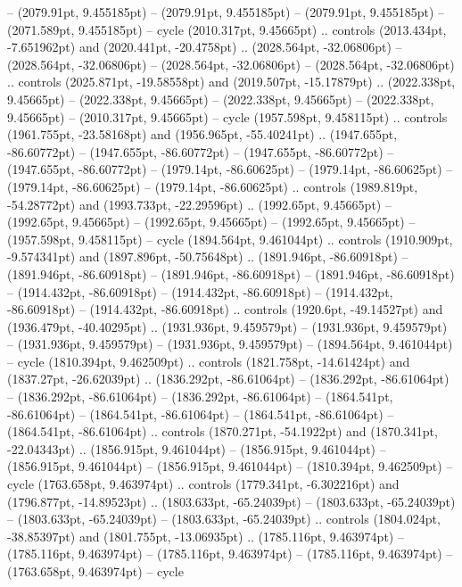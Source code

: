  -- (2079.91pt, 9.455185pt)
 -- (2079.91pt, 9.455185pt)
 -- (2079.91pt, 9.455185pt)
 -- (2071.589pt, 9.455185pt) -- cycle
(2010.317pt, 9.45665pt) .. controls (2013.434pt, -7.651962pt) and (2020.441pt, -20.4758pt) .. (2028.564pt, -32.06806pt)
 -- (2028.564pt, -32.06806pt)
 -- (2028.564pt, -32.06806pt)
 -- (2028.564pt, -32.06806pt) .. controls (2025.871pt, -19.58558pt) and (2019.507pt, -15.17879pt) .. (2022.338pt, 9.45665pt)
 -- (2022.338pt, 9.45665pt)
 -- (2022.338pt, 9.45665pt)
 -- (2022.338pt, 9.45665pt)
 -- (2010.317pt, 9.45665pt) -- cycle
(1957.598pt, 9.458115pt) .. controls (1961.755pt, -23.58168pt) and (1956.965pt, -55.40241pt) .. (1947.655pt, -86.60772pt)
 -- (1947.655pt, -86.60772pt)
 -- (1947.655pt, -86.60772pt)
 -- (1947.655pt, -86.60772pt)
 -- (1979.14pt, -86.60625pt)
 -- (1979.14pt, -86.60625pt)
 -- (1979.14pt, -86.60625pt)
 -- (1979.14pt, -86.60625pt) .. controls (1989.819pt, -54.28772pt) and (1993.733pt, -22.29596pt) .. (1992.65pt, 9.45665pt)
 -- (1992.65pt, 9.45665pt)
 -- (1992.65pt, 9.45665pt)
 -- (1992.65pt, 9.45665pt)
 -- (1957.598pt, 9.458115pt) -- cycle
(1894.564pt, 9.461044pt) .. controls (1910.909pt, -9.574341pt) and (1897.896pt, -50.75648pt) .. (1891.946pt, -86.60918pt)
 -- (1891.946pt, -86.60918pt)
 -- (1891.946pt, -86.60918pt)
 -- (1891.946pt, -86.60918pt)
 -- (1914.432pt, -86.60918pt)
 -- (1914.432pt, -86.60918pt)
 -- (1914.432pt, -86.60918pt)
 -- (1914.432pt, -86.60918pt) .. controls (1920.6pt, -49.14527pt) and (1936.479pt, -40.40295pt) .. (1931.936pt, 9.459579pt)
 -- (1931.936pt, 9.459579pt)
 -- (1931.936pt, 9.459579pt)
 -- (1931.936pt, 9.459579pt)
 -- (1894.564pt, 9.461044pt) -- cycle
(1810.394pt, 9.462509pt) .. controls (1821.758pt, -14.61424pt) and (1837.27pt, -26.62039pt) .. (1836.292pt, -86.61064pt)
 -- (1836.292pt, -86.61064pt)
 -- (1836.292pt, -86.61064pt)
 -- (1836.292pt, -86.61064pt)
 -- (1864.541pt, -86.61064pt)
 -- (1864.541pt, -86.61064pt)
 -- (1864.541pt, -86.61064pt)
 -- (1864.541pt, -86.61064pt) .. controls (1870.271pt, -54.1922pt) and (1870.341pt, -22.04343pt) .. (1856.915pt, 9.461044pt)
 -- (1856.915pt, 9.461044pt)
 -- (1856.915pt, 9.461044pt)
 -- (1856.915pt, 9.461044pt)
 -- (1810.394pt, 9.462509pt) -- cycle
(1763.658pt, 9.463974pt) .. controls (1779.341pt, -6.302216pt) and (1796.877pt, -14.89523pt) .. (1803.633pt, -65.24039pt)
 -- (1803.633pt, -65.24039pt)
 -- (1803.633pt, -65.24039pt)
 -- (1803.633pt, -65.24039pt) .. controls (1804.024pt, -38.85397pt) and (1801.755pt, -13.06935pt) .. (1785.116pt, 9.463974pt)
 -- (1785.116pt, 9.463974pt)
 -- (1785.116pt, 9.463974pt)
 -- (1785.116pt, 9.463974pt)
 -- (1763.658pt, 9.463974pt) -- cycle
